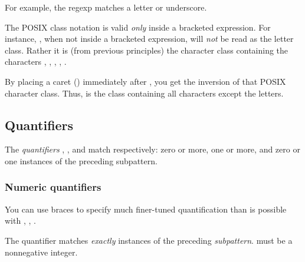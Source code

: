 {\medskip

\n For example, the regexp  
matches a letter or underscore.  


The POSIX class notation is valid {\em only} inside a
bracketed expression.  For instance, \p{[:alpha:]},
when not inside a bracketed expression, will {\em not}
be read as the letter class.
Rather it is (from previous principles) the character
class containing the characters \p{:}, , ,
, .


By placing a caret (\p{^}) immediately after
\p{[:}, you get the inversion of that POSIX
character class.  Thus, \p{[:^alpha]} 
is the class containing all characters 
except the letters.

\subsection{Quantifiers}

The {\em quantifiers} \p{*}, \p{+}, and
 match respectively: zero or more, one or more,
and zero or one instances of the preceding subpattern.


\subsubsection{Numeric quantifiers}

You can use braces to specify much finer-tuned
quantification than is possible with \p{*}, \p{+}, .

The quantifier  matches {\em exactly} 
instances of the preceding {\em subpattern}.  
must be a nonnegative integer.

}
